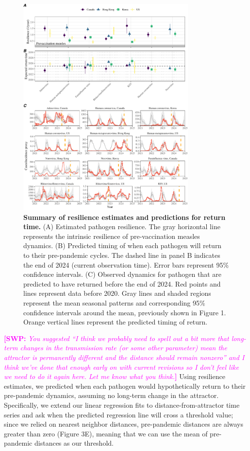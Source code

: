 \documentclass[12pt]{article}
\newcommand{\comment}{\showcomment}
\newcommand{\showcomment}[3]{\textcolor{#1}{\textbf{[#2: }\textsl{#3}\textbf{]}}}
\newcommand{\swp}[1]{\comment{magenta}{SWP}{#1}}
\begin{document}
\begin{figure}[!th]
\begin{center}
\includegraphics[width=0.8\textwidth]{../figure4/figure4.pdf}
\caption{
\textbf{Summary of resilience estimates and predictions for return time.}
(A) Estimated pathogen resilience.
The gray horizontal line represents the intrinsic resilience of pre-vaccination measles dynamics.
(B) Predicted timing of when each pathogen will return to their pre-pandemic cycles.
The dashed line in panel B indicates the end of 2024 (current observation time).
Error bars represent 95\% confidence intervals.
(C) Observed dynamics for pathogen that are predicted to have returned before the end of 2024.
Red points and lines represent data before 2020.
Gray lines and shaded regions represent the mean seasonal patterns and corresponding 95\% confidence intervals around the mean, previously shown in Figure 1.
Orange vertical lines represent the predicted timing of return.
}
\end{center}
\end{figure}

\swp{You suggested ``I think we probably need to spell out a bit more that long-term changes in the transmission rate (or some other parameter) mean the attractor is permanently different and the distance should remain nonzero'' and I think we've done that enough early on with current revisions so I don't feel like we need to do it again here. Let me know what you think.}
Using resilience estimates, we predicted when each pathogen would hypothetically return to their pre-pandemic dynamics, assuming no long-term change in the attractor.
Specifically, we extend our linear regression fits to distance-from-attractor time series and ask when the predicted regression line will cross a threshold value;
since we relied on nearest neighbor distances, pre-pandemic distances are always greater than zero (Figure 3E), meaning that we can use the mean of pre-pandemic distances as our threshold.
\end{document}
